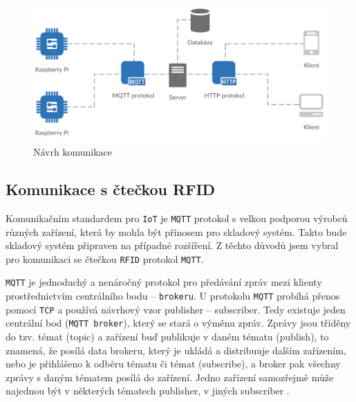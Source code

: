 \documentclass[czech,BP]{thesiskiv}
\begin{document}
				
				
		
		\begin{figure}[H]
   		 	\centering
			\includegraphics[width=1\textwidth]{../diagrams/network.png}	
			\caption{Návrh komunikace}
    		\label{fig:network}
		\end{figure}
		
		\subsection{Komunikace s čtečkou RFID}
			Komunikačním standardem pro \texttt{IoT} je \texttt{MQTT} protokol s velkou podporou výrobců různých zařízení, která by mohla být přínosem pro skladový systém. Takto bude skladový systém připraven na případné rozšíření.
			Z těchto důvodů jsem vybral pro komunikaci se čtečkou \texttt{RFID} protokol \texttt{MQTT}.
	
			 
			
			\texttt{MQTT} je jednoduchý a nenáročný protokol pro předávání zpráv mezi klienty prostřednictvím centrálního bodu – \texttt{brokeru}. U protokolu \texttt{MQTT} probíhá přenos pomocí \texttt{TCP} a používá návrhový vzor publisher – subscriber. Tedy existuje jeden centrální bod (\texttt{MQTT broker}), který se stará o výměnu zpráv. Zprávy jsou tříděny do tzv. témat (topic) a zařízení buď publikuje v daném tématu (publish), to znamená, že posílá data brokeru, který je ukládá a distribuuje dalším zařízením, nebo je přihlášeno k odběru tématu či témat (subscribe), a broker pak všechny zprávy s daným tématem posílá do zařízení. Jedno zařízení samozřejmě může najednou být v některých tématech publisher, v jiných subscriber \cite{maly2016mqtt}.
\end{document}
